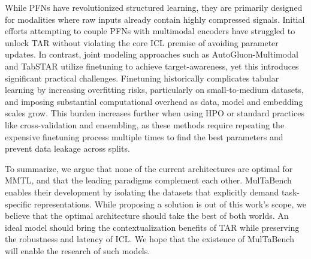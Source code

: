 \documentclass{article}
\begin{document}
While PFNs have revolutionized structured learning, they are primarily designed for modalities where raw inputs already contain highly compressed signals. Initial efforts attempting to couple PFNs with multimodal encoders \cite{luo_time_2025, kim_multimodalpfn_2025} have struggled to unlock TAR without violating the core ICL premise of avoiding parameter updates. In contrast, joint modeling approaches such as AutoGluon-Multimodal and TabSTAR utilize finetuning to achieve target-awareness, yet this introduces significant practical challenges. Finetuning historically complicates tabular learning by increasing overfitting risks, particularly on small-to-medium datasets, and imposing substantial computational overhead as data, model and embedding scales grow. This burden increases further when using HPO or standard practices like cross-validation and ensembling, as these methods require repeating the expensive finetuning process multiple times to find the best parameters and prevent data leakage across splits.

To summarize, we argue that none of the current architectures are optimal for MMTL, and that the leading paradigms complement each other. MulTaBench enables their development by isolating the datasets that explicitly demand task-specific representations. While proposing a solution is out of this work's scope, we believe that the optimal architecture should take the best of both worlds. An ideal model should bring the contextualization benefits of TAR while preserving the robustness and latency of ICL. We hope that the existence of MulTaBench will enable the research of such models.
\end{document}
